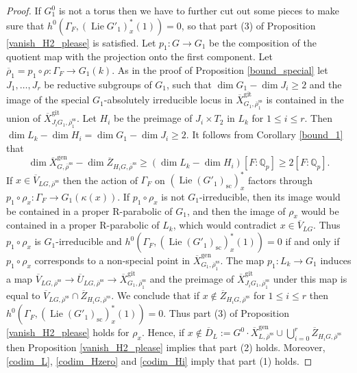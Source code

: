 \documentclass{amsart}
\theoremstyle{definition}
\theoremstyle{remark}
\newcommand{\Qp}{\mathbb {Q}_p}
\newcommand{\Zbar}{\overline{Z}}
\newcommand{\Vbar}{\overline{{V}}}
\newcommand{\rhobar}{\overline{\rho}}
\newcommand{\gen}{\mathrm{gen}}
\newcommand{\gps}{\mathrm{git}}
\newcommand{\Xbar}{\overline{X}}
\DeclareMathOperator{\Lie}{Lie}
\newcommand{\rhobarss}{\rhobar^{\mathrm{ss}}}
\newcommand{\Ubar}{\overline{U}}
\newcommand{\sic}{\operatorname{sc}}
\begin{document}
\begin{proof}
If $G_1^0$ is not a torus then we have to further cut out some pieces to make sure that 
$h^0(\Gamma_F, (\Lie G'_1)_x^*(1))=0$, so that part (3) of Proposition \ref{vanish_H2_please} is satisfied. Let $p_1: G\rightarrow G_1$ be the composition of the quotient map with the projection 
onto the first component. Let $\rhobar_1=p_1\circ\rho: \Gamma_F \rightarrow G_1(k)$. 
As in the proof of Proposition \ref{bound_special}
let $J_1, \ldots, J_r$ 
be reductive subgroups of $G_1$, such that $\dim G_1 - \dim J_i\ge 2$ and the 
image of the special $G_1$-absolutely irreducible locus in $\Xbar^{\gps}_{G_1,\rhobar_1^{\mathrm{ss}}}$
is contained in the union of $\Xbar^{\gps}_{J_i G_1, \rhobar_1^{\mathrm{ss}}}$. 
Let $H_i$ be the preimage of $J_i \times T_2$ in $L_k$ for $1\le i \le r$. Then 
$\dim L_k -\dim H_i = \dim G_1 - \dim J_i \ge 2$. It follows from Corollary \ref{bound_1} that 
\begin{equation}\label{codim_Hi}
\dim \Xbar^{\gen}_{G, \rhobarss} - \dim \Zbar_{H_i G, \rhobarss} \ge (\dim L_k - \dim H_i)[F:\Qp]\ge 
2[F:\Qp].
\end{equation}
If $x\in \Vbar_{LG, \rhobarss}$ then the action of $\Gamma_F$ on $(\Lie (G'_1)_{\sic})^*_x$ factors through
$p_1\circ \rho_x: \Gamma_F \rightarrow G_1(\kappa(x))$. If $p_1\circ \rho_{x}$ is not $G_1$-irreducible, then its image would be contained in a proper
R-parabolic of $G_1$, and then the image of $\rho_x$ would be contained in a proper
R-parabolic of $L_k$, which would contradict $x\in \Vbar_{LG}$. Thus $p_1\circ \rho_{x}$ is $G_1$-irreducible
and $h^0(\Gamma_F, (\Lie (G'_1)_{\sic})_x^*(1))=0$ if and only if $p_1\circ \rho_{x}$ corresponds to a non-special 
point in $\Xbar^{\gen}_{G_1, \rhobarss_1}$. 
The map $p_1: L_k\rightarrow G_1$ induces a map 
$\Vbar_{LG, \rhobarss} \rightarrow \Ubar_{LG, \rhobarss} \rightarrow \Xbar^{\gps}_{G_1, \rhobar_1^{\mathrm{ss}}}$ and the preimage of $\Xbar^{\gps}_{J_i G_1, \rhobarss_1}$ under this map 
is equal to $\Vbar_{LG, \rhobarss}\cap \Zbar_{H_i G, \rhobarss}$. We conclude that if 
$x\not \in \Zbar_{H_i G, \rhobarss}$ for $1\le i\le r$ then $h^0(\Gamma_F, (\Lie (G'_1)_{\sic})_x^*(1))=0$. 
Thus part (3) of Proposition \ref{vanish_H2_please} holds for $\rho_x$. 
Hence, if $x\not\in \overline{D}_L:=G^0\cdot \Xbar^{\gen}_{L, \rhobarss} \cup \bigcup\nolimits_{i=0}^r\Zbar_{H_i G, \rhobarss}$ then Proposition \ref{vanish_H2_please} implies that part (2) holds. 
Moreover, \eqref{codim_L}, \eqref{codim_Hzero} and \eqref{codim_Hi} imply 
that part (1) holds.  
\end{proof}
\end{document}
